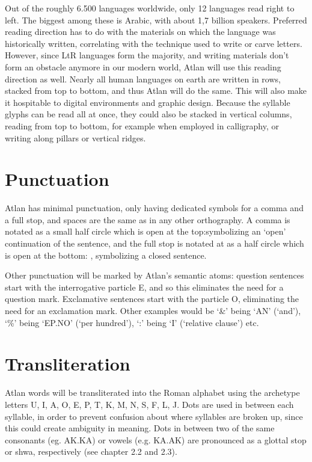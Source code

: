 Out of the roughly 6.500 languages worldwide, only 12 languages read right to left. The biggest among these is Arabic, with about 1,7 billion speakers. Preferred reading direction has to do with the materials on which the language was historically written, correlating with the technique used to write or carve letters. However, since LtR languages form the majority, and writing materials don’t form an obstacle anymore in our modern world, Atlan will use this reading direction as well. Nearly all human languages on earth are written in rows, stacked from top to bottom, and thus Atlan will do the same. This will also make it hospitable to digital environments and graphic design. Because the syllable glyphs can be read all at once, they could also be stacked in vertical columns, reading from top to bottom, for example when employed in calligraphy, or writing along pillars or vertical ridges. 

\section{Punctuation}
Atlan has minimal punctuation, only having dedicated symbols for a comma and a full stop, and spaces are the same as in any other orthography. A comma is notated as a small half circle which is open at the top:\comma symbolizing an ‘open’ continuation of the sentence, and the full stop is notated at as a half circle which is open at the bottom: \period , symbolizing a closed sentence. 

Other punctuation will be marked by Atlan’s semantic atoms: question sentences start with the interrogative particle E, and so this eliminates the need for a question mark. Exclamative sentences start with the particle O, eliminating the need for an exclamation mark. Other examples would be ‘\&’ being ‘AN’ (‘and’), ‘\%’ being ‘EP.NO’ (‘per hundred’), ‘:’ being ‘I’ (‘relative clause’) etc. 

\section{Transliteration}
Atlan words will be transliterated into the Roman alphabet using the archetype letters U, I, A, O, E, P, T, K, M, N, S, F, L, J. Dots are used in between each syllable, in order to prevent confusion about where syllables are broken up, since this could create ambiguity in meaning. Dots in between two of the same consonants (eg. AK.KA) or vowels (e.g. KA.AK) are pronounced as a glottal stop or shwa, respectively (see chapter 2.2 and 2.3). 

